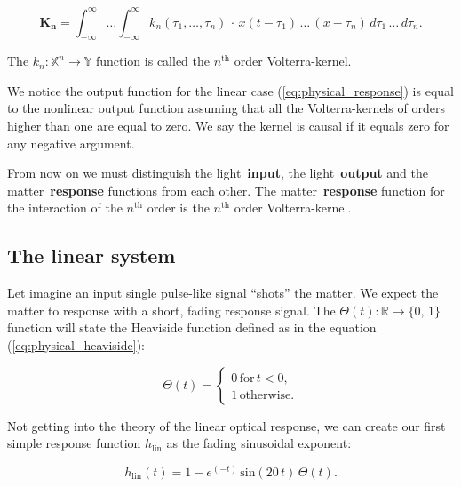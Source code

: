 \documentclass[12pt,twoside,a4paper]{article}
\numberwithin{equation}{subsection}
\numberwithin{figure}{subsection}
\begin{document}
\begin{equation} \label{eq:physical_volterraoperator}
  \mathbf{K_n} = \int_{ - \infty}^{\infty} \ldots \int_{ - \infty}^{\infty} k_n (\tau_1, \ldots, \tau_n) \, \cdot \, x(t - \tau_1) \, \ldots
  \, (x - \tau_n)\, d\tau_1 \, \ldots \, d\tau_n .
\end{equation}

The $ k_n : \mathbb{X}^{n} \rightarrow \mathbb{Y} $ function is called the $ n ^ {\text{th}} $ order Volterra-kernel. 

We notice the output function for the linear case (\ref{eq:physical_response}) is equal to the nonlinear output function assuming that all
the Volterra-kernels of orders higher than one are equal to zero. We say the kernel is causal if it equals zero for any negative
argument.

From now on we must distinguish the light~\textbf{input}, the light~\textbf{output} and the matter~\textbf{response} functions from each
other. The matter~\textbf{response} function for the interaction of the $ n^{\text{th}} $ order is the $ n^{\text{th}} $ order
Volterra-kernel.

\subsection{The linear system} \label{chap:physical_linearsystem}

Let imagine an input single pulse-like signal ``shots'' the matter. We expect the matter to response with a short, fading response signal.
The $ \Theta (t) : \mathbb{R} \rightarrow \{0, \, 1 \} $ function will state the Heaviside function defined as in the equation
(\ref{eq:physical_heaviside}):

\begin{equation} \label{eq:physical_heaviside}
   \Theta(t)  =  
   \begin{cases}
     0 \, \text{for} \, t < 0, \\
     1 \, \text{otherwise}.
   \end{cases}
\end{equation}

Not getting into the theory of the linear optical response, we can create our first simple response function $ h_{\text{lin}} $ as the
fading sinusoidal exponent:

\begin{equation} \label{eq:physical_linear_response}
  h_{\text{lin}} (t) = 1 - e^{( - t)}\,\mathrm{sin}(20\,t)\,\Theta (t) .
\end{equation}
\end{document}
